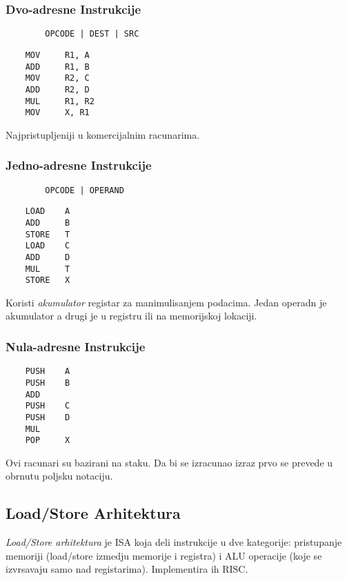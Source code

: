 \documentclass[12p,a4paper]{article}
\begin{document}
\begin{multicols}{2}
    \subsubsection{Dvo-adresne Instrukcije}

    \begin{lstlisting}
        OPCODE | DEST | SRC
    \end{lstlisting}
    \begin{lstlisting}
    MOV     R1, A
    ADD     R1, B
    MOV     R2, C
    ADD     R2, D
    MUL     R1, R2
    MOV     X, R1
    \end{lstlisting}

    Najpristupljeniji u komercijalnim racunarima.

    \subsubsection{Jedno-adresne Instrukcije}

    \begin{lstlisting}
        OPCODE | OPERAND
    \end{lstlisting}
    \begin{lstlisting}
    LOAD    A
    ADD     B
    STORE   T
    LOAD    C
    ADD     D
    MUL     T
    STORE   X
    \end{lstlisting}

    Koristi \emph{akumulator} registar za manimulisanjem podacima. Jedan
    operadn je akumulator a drugi je u registru ili na memorijskoj lokaciji.

    \subsubsection{Nula-adresne Instrukcije}

    \begin{lstlisting}
    PUSH    A
    PUSH    B
    ADD
    PUSH    C
    PUSH    D
    MUL
    POP     X
    \end{lstlisting}

    Ovi racunari su bazirani na staku. Da bi se izracunao izraz prvo se 
    prevede u obrnutu poljsku notaciju.
    
    \subsection{Load/Store Arhitektura}

    \emph{Load/Store arhitektura} je ISA koja deli instrukcije u dve 
    kategorije: pristupanje memoriji (load/store izmedju memorije i registra)
    i ALU operacije (koje se izvrsavaju samo nad registarima). Implementira
    ih RISC.\
    

\end{multicols}
\end{document}
